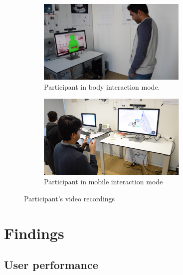 \begin{itemize}
\begin{figure}[H]
    \centering
    \begin{subfigure}[H]{0.45\textwidth}
        \centering
        \includegraphics[width=\textwidth,height=4cm]{Figures/6/singleBody}
        \caption{Participant in body interaction mode.}
        \label{fig:singlebody}
    \end{subfigure}
    \begin{subfigure}[H]{0.45\textwidth}
        \centering
        \includegraphics[width=\textwidth,height=4cm]{Figures/6/singleMobile}
        \caption{Participant in mobile interaction mode}
        \label{fig:singleMobile}
    \end{subfigure}
    \caption{Participant's video recordings}
    \label{fig:Focus_group_room}
\end{figure}

\end{itemize}



\section{Findings}


\subsection{User performance}


